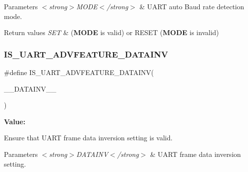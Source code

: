 \begin{DoxyParams}{Parameters}
{\em $<$strong$>$\+M\+O\+D\+E$<$/strong$>$} & U\+A\+RT auto Baud rate detection mode. \\
\hline
\end{DoxyParams}

\begin{DoxyRetVals}{Return values}
{\em S\+ET} & ({\bfseries{M\+O\+DE}} is valid) or R\+E\+S\+ET ({\bfseries{M\+O\+DE}} is invalid) \\
\hline
\end{DoxyRetVals}
\mbox{\label{group___u_a_r_t___private___macros_ga8f6cd85ae5ce7f8dd0ed9227ef5154f6}} 
\subsubsection{\texorpdfstring{IS\_UART\_ADVFEATURE\_DATAINV}{IS\_UART\_ADVFEATURE\_DATAINV}}
{\footnotesize\ttfamily \#define I\+S\+\_\+\+U\+A\+R\+T\+\_\+\+A\+D\+V\+F\+E\+A\+T\+U\+R\+E\+\_\+\+D\+A\+T\+A\+I\+NV(\begin{DoxyParamCaption}\item[{}]{\+\_\+\+\_\+\+D\+A\+T\+A\+I\+N\+V\+\_\+\+\_\+ }\end{DoxyParamCaption})}

{\bfseries Value\+:}
\begin{DoxyCode}{0}

\end{DoxyCode}


Ensure that U\+A\+RT frame data inversion setting is valid. 


\begin{DoxyParams}{Parameters}
{\em $<$strong$>$\+D\+A\+T\+A\+I\+N\+V$<$/strong$>$} & U\+A\+RT frame data inversion setting. \\
\hline
\end{DoxyParams}

